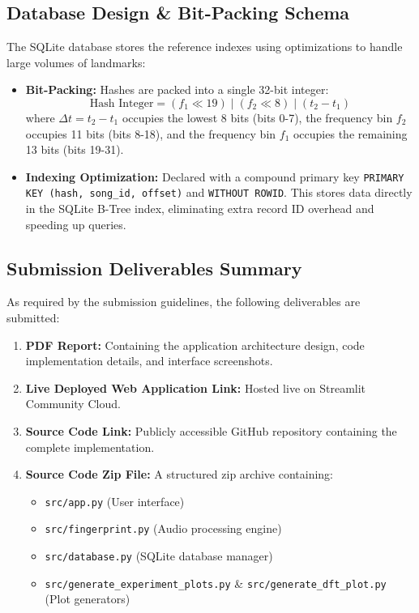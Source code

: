 \documentclass[11pt,a4paper]{article}
\begin{document}
\subsection{Database Design \& Bit-Packing Schema}
The SQLite database stores the reference indexes using optimizations to handle large volumes of landmarks:
\begin{itemize}
    \item \textbf{Bit-Packing:} Hashes are packed into a single 32-bit integer:
    \begin{equation}
        \text{Hash Integer} = (f_1 \ll 19) \mid (f_2 \ll 8) \mid (t_2 - t_1)
    \end{equation}
    where $\Delta t = t_2 - t_1$ occupies the lowest 8 bits (bits 0-7), the frequency bin $f_2$ occupies 11 bits (bits 8-18), and the frequency bin $f_1$ occupies the remaining 13 bits (bits 19-31).
    \item \textbf{Indexing Optimization:} Declared with a compound primary key \texttt{PRIMARY KEY (hash, song\_id, offset)} and \texttt{WITHOUT ROWID}. This stores data directly in the SQLite B-Tree index, eliminating extra record ID overhead and speeding up queries.
\end{itemize}

\subsection{Submission Deliverables Summary}
As required by the submission guidelines, the following deliverables are submitted:
\begin{enumerate}
    \item \textbf{PDF Report:} Containing the application architecture design, code implementation details, and interface screenshots.
    \item \textbf{Live Deployed Web Application Link:} Hosted live on Streamlit Community Cloud.
    \item \textbf{Source Code Link:} Publicly accessible GitHub repository containing the complete implementation.
    \item \textbf{Source Code Zip File:} A structured zip archive containing:
    \begin{itemize}
        \item \texttt{src/app.py} (User interface)
        \item \texttt{src/fingerprint.py} (Audio processing engine)
        \item \texttt{src/database.py} (SQLite database manager)
        \item \texttt{src/generate\_experiment\_plots.py} \& \texttt{src/generate\_dft\_plot.py} (Plot generators)
    \end{itemize}
\end{enumerate}
\end{document}
